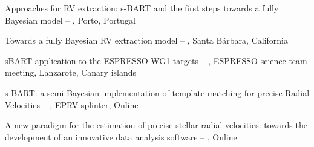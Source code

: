 
\begin{rubric}{}
	Approaches for RV extraction: s-BART and the first steps towards a fully Bayesian model -- , Porto, Portugal

	Towards a fully Bayesian RV extraction model -- , Santa Bárbara, California

	sBART application to the ESPRESSO WG1 targets -- , ESPRESSO science team meeting, Lanzarote, Canary islands

\entry*[Exoplanets IV]
	s-BART: a semi-Bayesian implementation of template matching for precise Radial Velocities -- , EPRV splinter, Online 

 A new paradigm for the estimation of precise stellar radial velocities: towards the development of an innovative data analysis software -- , Online
\end{rubric}

